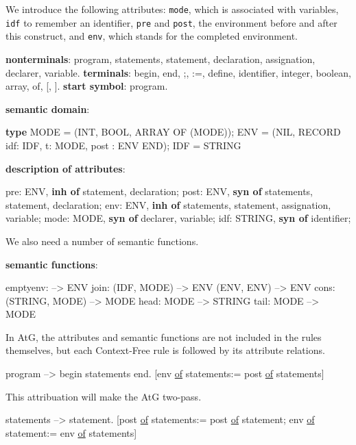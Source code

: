 We introduce the following attributes: {\tt mode}, which is
associated with variables, {\tt idf} to remember an identifier,
{\tt pre} and {\tt post}, the environment before and after this construct,
and {\tt env}, which stands for the completed environment.
\begin{elan}
{\bf nonterminals}: program, statements, statement, declaration,
    assignation, declarer, variable.
{\bf terminals}: begin, end, ;, :=, define, identifier, integer,
    boolean, array, of, [, ].
{\bf start symbol}: program.
\end{elan}
\begin{elan}
{\bf semantic domain}:
\end{elan}
\begin{elan}
    {\bf type} MODE = (INT, BOOL, ARRAY OF (MODE));
          ENV  = (NIL, RECORD idf: IDF, t: MODE, post : ENV END);
          IDF  = STRING
\end{elan}
\begin{elan}
{\bf description of attributes}:
\end{elan}
\begin{elan}
    pre:  ENV, {\bf inh of} statement, declaration;
    post: ENV, {\bf syn of} statements, statement, declaration;
    env:  ENV, {\bf inh of} statements, statement, assignation, variable;
    mode: MODE, {\bf syn of} declarer, variable;
    idf:  STRING, {\bf syn of} identifier;
\end{elan}
We also need a number of semantic functions.
\begin{elan}
{\bf semantic functions}:
\end{elan}
\begin{elan}
    emptyenv:            --> ENV
    join:    (IDF, MODE) --> ENV
             (ENV, ENV)  --> ENV
    cons: (STRING, MODE) --> MODE
    head:           MODE --> STRING
    tail:           MODE --> MODE
\end{elan}
In AtG, the attributes and semantic functions are not included
in the rules themselves, but each Context-Free rule is followed
by its attribute relations.
\begin{elan}
program --> begin statements end.
   [env \underline{of} statements:= post \underline{of} statements]
\end{elan}
This attribuation will make the AtG two-pass.
\begin{elan}
statements --> statement.
   [post \underline{of} statements:= post \underline{of} statement;
    env \underline{of} statement:= env \underline{of} statements]
\end{elan}
